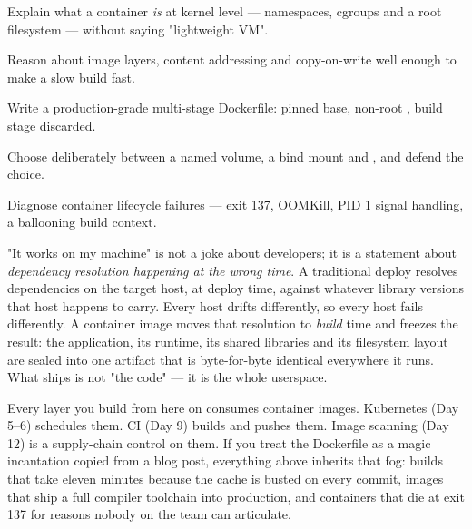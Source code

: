 
\begin{objectives}
\begin{wbitem}
  \item Explain what a container \emph{is} at kernel level --- namespaces, cgroups and a root filesystem --- without saying "lightweight VM".
  \item Reason about image layers, content addressing and copy-on-write well enough to make a slow build fast.
  \item Write a production-grade multi-stage Dockerfile: pinned base, non-root , build stage discarded.
  \item Choose deliberately between a named volume, a bind mount and , and defend the choice.
  \item Diagnose container lifecycle failures --- exit 137, OOMKill, PID 1 signal handling, a ballooning build context.
\end{wbitem}
\end{objectives}


 "It works on my machine" is not a joke about developers; it is a statement about \emph{dependency resolution happening at the wrong time}. A traditional deploy resolves dependencies on the target host, at deploy time, against whatever library versions that host happens to carry. Every host drifts differently, so every host fails differently. A container image moves that resolution to \emph{build} time and freezes the result: the application, its runtime, its shared libraries and its filesystem layout are sealed into one artifact that is byte-for-byte identical everywhere it runs. What ships is not "the code" --- it is the whole userspace.

 Every layer you build from here on consumes container images. Kubernetes (Day 5--6) schedules them. CI (Day 9) builds and pushes them. Image scanning (Day 12) is a supply-chain control on them. If you treat the Dockerfile as a magic incantation copied from a blog post, everything above inherits that fog: builds that take eleven minutes because the cache is busted on every commit, images that ship a full compiler toolchain into production, and containers that die at exit 137 for reasons nobody on the team can articulate.

